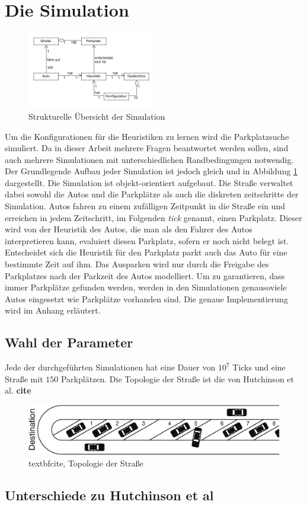 \section{Die Simulation}
\begin{figure}
\includegraphics[width=0.5\textwidth]{uml/simOverview.png}
\caption{Strukturelle Übersicht der Simulation}\label{fig_simOver}
\end{figure}
Um die Konfigurationen für die Heuristiken zu lernen wird die Parkplatzsuche simuliert. Da in dieser Arbeit mehrere Fragen beantwortet werden sollen, sind auch mehrere Simulationen mit unterschiedlichen Randbedingungen notwendig. Der Grundlegende Aufbau jeder Simulation ist jedoch gleich und in Abbildung \ref{fig_simOver} dargestellt. Die Simulation ist objekt-orientiert aufgebaut. Die Straße verwaltet dabei sowohl die Autos und die Parkplätze als auch die diskreten zeitschritte der Simulation. Autos fahren zu einem zufälligen Zeitpunkt in die Straße ein und erreichen in jedem Zeitschritt, im Folgenden \emph{tick} genannt, einen Parkplatz. Dieser wird von der Heuristik des Autos, die man als den Fahrer des Autos interpretieren kann, evaluiert diesen Parkplatz, sofern er noch nicht belegt ist. Entscheidet sich die Heuristik für den Parkplatz parkt auch das Auto für eine bestimmte Zeit auf ihm. Das Ausparken wird nur durch die Freigabe des Parkplatzes nach der Parkzeit des Autos modelliert. Um zu garantieren, dass immer Parkplätze gefunden werden, werden in den Simulationen genausoviele Autos eingesetzt wie Parkplätze vorhanden sind. Die genaue Implementierung wird im Anhang erläutert.

\subsection{Wahl der Parameter}
Jede der durchgeführten Simulationen hat eine Dauer von $10^7$ Ticks und eine Straße mit $150$ Parkplätzen. Die Topologie der Straße ist die von Hutchinson et al. \textbf{cite}
\begin{figure}
\includegraphics[width=\textwidth]{pics/street.png}
\caption{textbf{cite}, Topologie der Straße}
\end{figure}




\subsection{Unterschiede zu Hutchinson et al}


